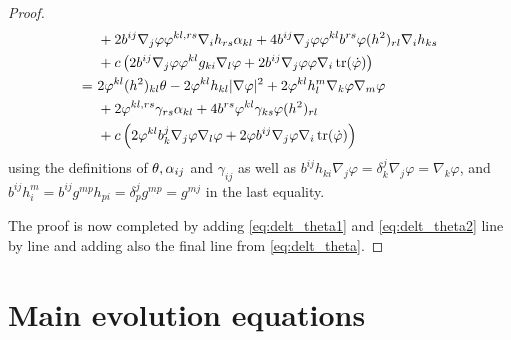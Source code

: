 \documentclass{amsart}
\begin{document}
\begin{proof}
\begin{equation}
\begin{split}
\quad &+ 2 b^{ij} \nabla_j\varphi \varphi^{kl,rs}\nabla_i h_{rs} \alpha_{kl}  + 4 b^{ij} \nabla_j\varphi \varphi^{kl} b^{rs} \varphi(h^2)_{rl} \nabla_i h_{ks} \\
\quad &+ c\left(2 b^{ij} \nabla_j\varphi \varphi^{kl}g_{ki} \nabla_l \varphi + 2 b^{ij} \nabla_j\varphi \varphi \nabla_i \operatorname{tr}(\dot{\varphi})\right) \\
=\ &2 \varphi^{kl}(h^2)_{kl}\theta - 2 \varphi^{kl}h_{kl} |\nabla\varphi|^2 + 2 \varphi^{kl} h^{m}_{l} \nabla_k\varphi \nabla_m \varphi \\
\quad &+ 2 \varphi^{kl,rs} \gamma_{rs} \alpha_{kl} + 4 b^{rs} \varphi^{kl} \gamma_{ks} \varphi(h^2)_{rl} \\
\quad &+ c\left(2 \varphi^{kl} b^j_k \nabla_j\varphi \nabla_l \varphi + 2 \varphi b^{ij} \nabla_j\varphi \nabla_i \operatorname{tr}(\dot{\varphi})\right)
\end{split}
\end{equation}
using the definitions of \(\theta, \alpha_{ij}\) and \(\gamma_{ij}\) as well as \(b^{ij}h_{ki} \nabla_j \varphi = \delta^j_k \nabla_j \varphi = \nabla_k \varphi\), and \(b^{ij} h^m_i = b^{ij} g^{mp}h_{pi} = \delta^j_p g^{mp} = g^{mj}\) in the last equality.

The proof is now completed by adding \cref{eq:delt_theta1} and \cref{eq:delt_theta2} line by line and adding also the final line from \cref{eq:delt_theta}.
\end{proof}

\section{Main evolution equations}
\label{sec:main_evolution}
\end{document}
